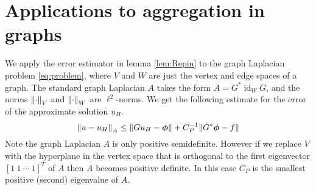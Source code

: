 \documentclass[ ]{elsarticle}
\newcommand{\id}{\operatorname{id}}
\newcommand{\Grad}{G}
\newcommand{\Div}{G^*}
\newcommand{\vsp}{V}
\newcommand{\esp}{W}
\newcommand{\norm}[1]{\left\lVert#1\right\rVert}
\let\originalleft\left
\let\originalright\right
\renewcommand{\left}{\mathopen{}\mathclose\bgroup\originalleft}
\renewcommand{\right}{\aftergroup\egroup\originalright}
\numberwithin{equation}{section}
\begin{document}
\section{Applications to aggregation in graphs}
We apply the error estimator in lemma \ref{lem:Repin} to the graph
Laplacian problem \eqref{eq:problem}, where $\vsp$ and $\esp$ are just
the vertex and edge spaces of a graph. The standard graph Laplacian
$A$ takes the form $A = \Div\id_{\esp}\Grad$, and the norms
$\norm{\cdot}_\vsp$ and $\norm{\cdot}_{\esp}$ are $\ell^2$-norms. We
get the following estimate for the error of the approximate solution
$u_H$.
\begin{equation}\label{eq:estimator}%
  \norm{u-u_H}_A \leq \norm{\Grad u_H - \bm\phi} +
  C_P^{-1}\norm{\Div\bm\phi - f}%
\end{equation}
Note the graph Laplacian $A$ is only positive semidefinite. However if
we replace $\vsp$ with the hyperplane in the vertex space that is
orthogonal to the first eigenvector $[1\ 1\ \cdots\ 1]^T$ of $A$ then
$A$ becomes positive definite. In this case $C_P$ is the smallest
positive (second) eigenvalue of $A$.
\end{document}
